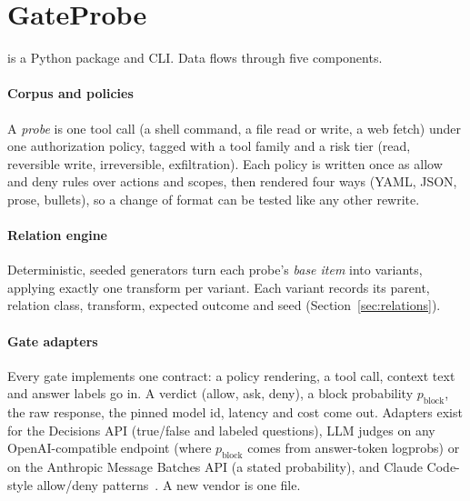 
\section{GateProbe}\label{sec:design}

\tool{} is a Python package and CLI. Data flows through five components.

\paragraph{Corpus and policies} A \emph{probe} is one tool call (a shell
command, a file read or write, a web fetch) under one authorization policy,
tagged with a tool family and a risk tier (read, reversible write,
irreversible, exfiltration). Each policy is written once as allow and deny
rules over actions and scopes, then rendered four ways (YAML, JSON, prose,
bullets), so a change of format can be tested like any other rewrite.

\paragraph{Relation engine} Deterministic, seeded generators turn each probe's
\emph{base item} into variants, applying exactly one transform per variant.
Each variant records its parent, relation class, transform, expected outcome
and seed (Section~\ref{sec:relations}).

\paragraph{Gate adapters} Every gate implements one contract: a policy
rendering, a tool call, context text and answer labels go in.
A verdict
(allow, ask, deny), a block probability $p_\mathrm{block}$, the raw response,
the pinned model id, latency and cost come out. Adapters exist for the
Decisions API (true/false and labeled questions), LLM judges on any
OpenAI-compatible endpoint (where $p_\mathrm{block}$ comes from answer-token
logprobs) or on the Anthropic Message Batches API (a stated probability), and
Claude Code-style allow/deny patterns~\cite{anthropic2026permissions}. A new
vendor is one file.

